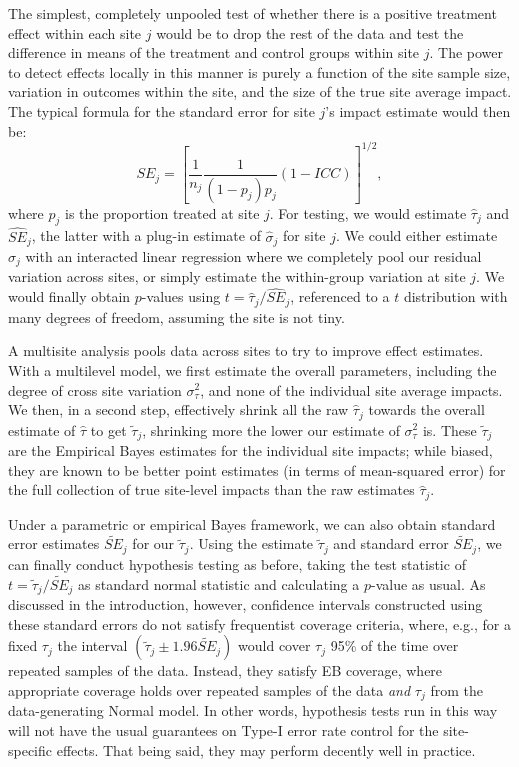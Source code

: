 \documentclass[]{article}
\begin{document}
The simplest, completely unpooled test of whether there is a positive treatment effect within each site $j$ would be to drop the rest of the data and test the difference in means of the treatment and control groups within site $j$.
The power to detect effects locally in this manner is purely a function of the site sample size, variation in outcomes within the site, and the size of the true site average impact.
The typical formula for the standard error for site $j$'s impact estimate would then be:
$$ SE_j = \left[ \frac{1}{n_j} \frac{1}{(1-p_j)p_j} (1-ICC) \right]^{1/2} , $$ 
where $p_j$ is the proportion treated at site $j$.
For testing, we would estimate $\hat{\tau}_j$ and $\widehat{SE}_j$, the latter with a plug-in estimate of $\hat{\sigma}_j$ for site $j$.
We could either estimate $\hat{\sigma}_j$ with an interacted linear regression where we completely pool our residual variation across sites, or simply estimate the within-group variation at site $j$.
We would finally obtain $p$-values using $t = \hat{\tau}_j / \widehat{SE}_j$, referenced to a $t$ distribution with many degrees of freedom, assuming the site is not tiny.

A multisite analysis pools data across sites to try to improve effect estimates.
With a multilevel model, we first estimate the overall parameters, including the degree of cross site variation $\sigma^2_\tau$, and none of the individual site average impacts.
We then, in a second step, effectively shrink all the raw $\hat{\tau}_j$ towards the overall estimate of $\hat{\tau}$ to get $\tilde{\tau}_j$, shrinking more the lower our estimate of $\sigma^2_\tau$ is.
These $\tilde{\tau}_j$ are the Empirical Bayes estimates for the individual site impacts; while biased, they are known to be better point estimates (in terms of mean-squared error) for the full collection of true site-level impacts than the raw estimates $\hat{\tau}_j$.

Under a parametric or empirical Bayes framework, we can also obtain standard error estimates $\tilde{SE}_j$ for our $\tilde{\tau}_j$.
Using the estimate $\tilde{\tau}_j$ and standard error $\tilde{SE}_j$, we can finally conduct hypothesis testing as before, taking the test statistic of $t = \tilde{\tau}_j / \tilde{SE}_j$ as standard normal statistic and calculating a $p$-value as usual.
As discussed in the introduction, however, confidence intervals constructed using these standard errors do not satisfy frequentist coverage criteria, where, e.g., for a fixed $\tau_j$ the interval $(\tilde{\tau}_j \pm 1.96 \tilde{SE}_j)$ would cover $\tau_j$ 95\% of the time over repeated samples of the data.
Instead, they satisfy EB coverage, where appropriate coverage holds over repeated samples of the data \textit{and} $\tau_j$ from the data-generating Normal model.
In other words, hypothesis tests run in this way will not have the usual guarantees on Type-I error rate control for the site-specific effects.
That being said, they may perform decently well in practice.
\end{document}
